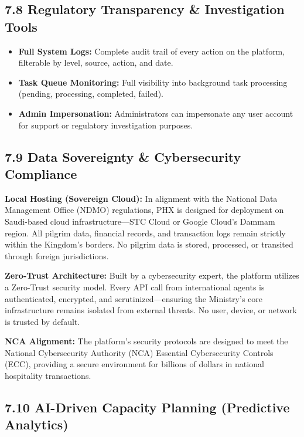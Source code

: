 \documentclass[11pt,a4paper]{article}
\begin{document}
\subsection*{7.8 Regulatory Transparency \& Investigation Tools}

\begin{itemize}
  \item \textbf{Full System Logs:} Complete audit trail of every action on the platform, filterable by level, source, action, and date.
  \item \textbf{Task Queue Monitoring:} Full visibility into background task processing (pending, processing, completed, failed).
  \item \textbf{Admin Impersonation:} Administrators can impersonate any user account for support or regulatory investigation purposes.
\end{itemize}

\subsection*{7.9 Data Sovereignty \& Cybersecurity Compliance}

\textbf{Local Hosting (Sovereign Cloud):} In alignment with the National Data Management Office (NDMO) regulations, PHX is designed for deployment on Saudi-based cloud infrastructure---STC Cloud or Google Cloud's Dammam region. All pilgrim data, financial records, and transaction logs remain strictly within the Kingdom's borders. No pilgrim data is stored, processed, or transited through foreign jurisdictions.

\vspace{0.3cm}

\textbf{Zero-Trust Architecture:} Built by a cybersecurity expert, the platform utilizes a Zero-Trust security model. Every API call from international agents is authenticated, encrypted, and scrutinized---ensuring the Ministry's core infrastructure remains isolated from external threats. No user, device, or network is trusted by default.

\vspace{0.3cm}

\textbf{NCA Alignment:} The platform's security protocols are designed to meet the National Cybersecurity Authority (NCA) Essential Cybersecurity Controls (ECC), providing a secure environment for billions of dollars in national hospitality transactions.

\subsection*{7.10 AI-Driven Capacity Planning (Predictive Analytics)}
\end{document}
